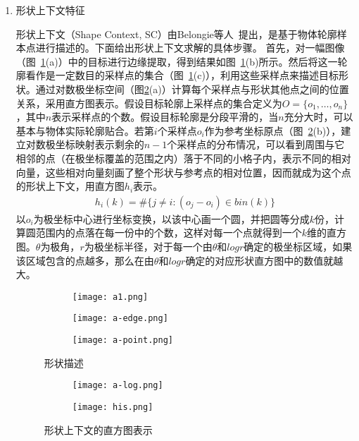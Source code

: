 \begin{enumerate}
\item 形状上下文特征
    
    形状上下文（Shape Context, SC）由Belongie等人~\cite{belongie2002shape}提出，是基于物体轮廓样本点进行描述的。下面给出形状上下文求解的具体步骤。
    首先，对一幅图像（图~\ref{fig: ShapeDescription}(a)）中的目标进行边缘提取，得到结果如图~\ref{fig: ShapeDescription}(b)所示。然后将这一轮廓看作是一定数目的采样点的集合（图~\ref{fig: ShapeDescription}(c)），利用这些采样点来描述目标形状。通过对数极坐标空间（图\ref{fig: ShapeHistogram}(a)）计算每个采样点与形状其他点之间的位置关系，采用直方图表示。假设目标轮廓上采样点的集合定义为$O = \{o_1, \ldots, o_n\}$，其中$n$表示采样点的个数。假设目标轮廓是分段平滑的，当$n$充分大时，可以基本与物体实际轮廓贴合。若第$i$个采样点$o_i$作为参考坐标原点（图~\ref{fig: ShapeHistogram}(b)），建立对数极坐标映射表示剩余的$n-1$个采样点的分布情况，可以看到周围与它相邻的点（在极坐标覆盖的范围之内）落于不同的小格子内，表示不同的相对向量，这些相对向量刻画了整个形状与参考点的相对位置，因而就成为这个点的形状上下文，用直方图$h_i$表示。
\begin{align}
h_i(k) = \# \{j \ne i : (o_j - o_i) \in bin(k)\}
\label{eq: shape context}
\end{align}
以$o_i$为极坐标中心进行坐标变换，以该中心画一个圆，并把圆等分成$k$份，计算圆范围内的点落在每一份中的个数，这样对每一个点就得到一个$k$维的直方图。$\theta$为极角，$r$为极坐标半径，对于每一个由$\theta$和$logr$确定的极坐标区域，如果该区域包含的点越多，那么在由$\theta$和$logr$确定的对应形状直方图中的数值就越大。 

\begin{figure}[t]
  \centering%
  \begin{subfigure}{0.23\linewidth}
    \texttt{[image: a1.png]}
    \caption{}
  \end{subfigure}
  \begin{subfigure}{0.23\linewidth}
    \texttt{[image: a-edge.png]}
    \caption{}
  \end{subfigure}
   \begin{subfigure}{0.234\linewidth}
    \texttt{[image: a-point.png]}
    \caption{}
  \end{subfigure}
  \caption{形状描述}
  \label{fig: ShapeDescription}
\end{figure}

\begin{figure}[t]
  \centering%
  \begin{subfigure}{0.3\linewidth}
    \texttt{[image: a-log.png]}
    \caption{}
  \end{subfigure}
  \hspace{4em}%
  \begin{subfigure}{0.35\linewidth}
    \texttt{[image: his.png]}
    \caption{}
  \end{subfigure}
  \caption{形状上下文的直方图表示}
  \label{fig: ShapeHistogram}
\end{figure}



\end{enumerate}
